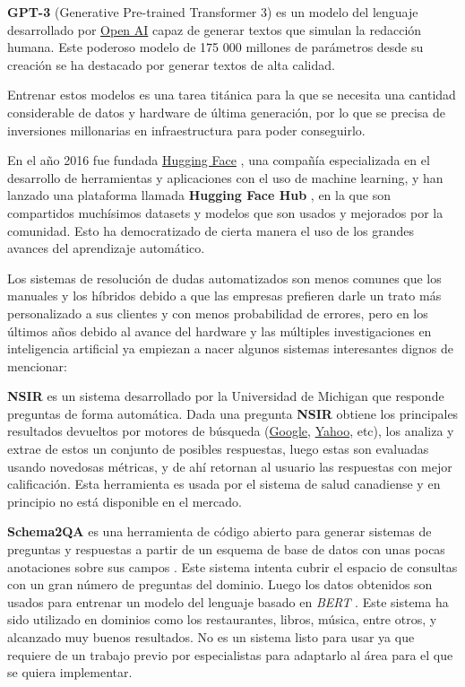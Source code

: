 \textbf{GPT-3} (Generative Pre-trained Transformer 3) es un modelo del lenguaje desarrollado por \href{https://openai.com/}{Open AI} capaz de generar textos que simulan la redacción humana. Este poderoso modelo de 175 000 millones de parámetros desde su creación se ha destacado por generar textos de alta calidad.
\newline

Entrenar estos modelos es una tarea titánica para la que se necesita una cantidad considerable de datos y hardware de última generación, por lo que se precisa de inversiones millonarias en infraestructura para poder conseguirlo.
\newline

En el año 2016 fue fundada \href{https://huggingface.co/}{Hugging Face} \cite{hugging_face}, una compañía especializada en el desarrollo de herramientas y aplicaciones con el uso de machine learning, y han lanzado una plataforma llamada \textbf{Hugging Face Hub} \cite{hugging_face_hub}, en la que son compartidos muchísimos datasets y modelos que son usados y mejorados por la comunidad. Esto ha democratizado de cierta manera el uso de los grandes avances del aprendizaje automático.
\newline

Los sistemas de resolución de dudas automatizados son menos comunes que los manuales y los híbridos debido a que las empresas prefieren darle un trato más personalizado a sus clientes y con menos probabilidad de errores, pero en los últimos años debido al avance del hardware y las múltiples investigaciones en inteligencia artificial ya empiezan a nacer algunos sistemas interesantes dignos de mencionar:
\newline

\textbf{NSIR} \cite{nsir} es un sistema desarrollado por la Universidad de Michigan que responde preguntas de forma automática. Dada una pregunta \textbf{NSIR} obtiene los principales resultados devueltos por motores de búsqueda (\href{google.com}{Google}, \href{yahoo.com}{Yahoo}, etc), los analiza y extrae de estos un conjunto de posibles respuestas, luego estas son evaluadas usando novedosas métricas, y de ahí retornan al usuario las respuestas con mejor calificación. Esta herramienta es usada por el sistema de salud canadiense y en principio no está disponible en el mercado.
\newline

\textbf{Schema2QA} \cite{s2qa} es una herramienta de código abierto para generar sistemas de preguntas y respuestas a partir de un esquema de base de datos con unas pocas anotaciones sobre sus campos \cite{s2qa}. Este sistema intenta cubrir el espacio de consultas con un gran número de preguntas del dominio. Luego los datos obtenidos son usados para entrenar un modelo del lenguaje basado en \textit{BERT} \cite{bert}. Este sistema ha sido utilizado en dominios como los restaurantes, libros, música, entre otros, y alcanzado muy buenos resultados. No es un sistema listo para usar ya que requiere de un trabajo previo por especialistas para adaptarlo al área para el que se quiera implementar.
\newline
 

